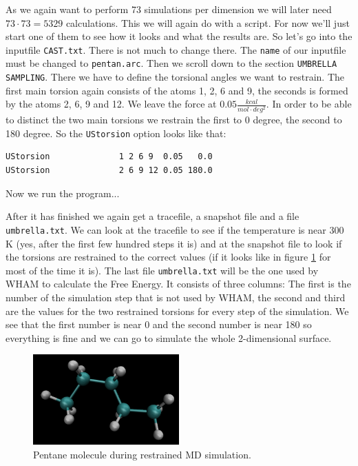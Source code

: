 \documentclass[a4paper,11pt]{scrartcl}
\begin{document}
As we again want to perform 73 simulations per dimension we will later need $73 \cdot 73 = 5329$ calculations. This we will again do with a script. For now we'll just start one of them to see how it looks and what the results are. So let's go into the inputfile \texttt{CAST.txt}. There is not much to change there. The \texttt{name} of our inputfile must be changed to \texttt{pentan.arc}. Then we scroll down to the section \texttt{UMBRELLA SAMPLING}. There we have to define the torsional angles we want to restrain. The first main torsion again consists of the atoms 1, 2, 6 and 9, the seconds is formed by the atoms 2, 6, 9 and 12. We leave the force at $0.05 \frac{kcal}{mol \cdot deg^2}$. In order to be able to distinct the two main torsions we restrain the first to 0 degree, the second to 180 degree. So the \texttt{UStorsion} option looks like that:
\begin{lstlisting}[frame=single,]
UStorsion              1 2 6 9  0.05   0.0
UStorsion              2 6 9 12 0.05 180.0
\end{lstlisting}
Now we run the program...

After it has finished we again get a tracefile, a snapshot file and a file \texttt{umbrella.txt}. We can look at the tracefile to see if the temperature is near 300\,K (yes, after the first few hundred steps it is) and at the snapshot file to look if the torsions are restrained to the correct values (if it looks like in figure \ref{fig:pentan} for most of the time it is). The last file \texttt{umbrella.txt} will be the one used by WHAM to calculate the Free Energy. It consists of three columns: The first is the number of the simulation step that is not used by WHAM, the second and third are the values for the two restrained torsions for every step of the simulation. We see that the first number is near 0 and the second number is near 180 so everything is fine and we can go to simulate the whole 2-dimensional surface.

\begin{figure}[htb]
	\center
	\includegraphics[width=0.5\textwidth]{Img/pentan.png}\caption{Pentane molecule during restrained MD simulation.}
	\label{fig:pentan}
\end{figure}
\end{document}

